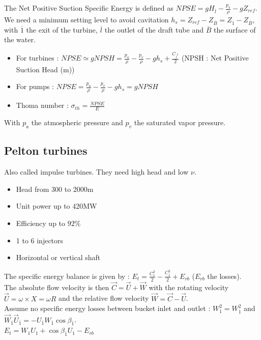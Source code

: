 \documentclass[../main.tex]{subfiles}
\begin{document}
The Net Positive Suction Specific Energy is defined as $NPSE = gH_{\overline{l}} - \frac{p_v}{\rho} - gZ_{ref}$. We need a minimum setting level to avoid cavitation $h_s = Z_{ref} - Z_{\overline{B}} = Z_{\overline{1}} - Z_{\overline{B}}$, with $\overline{1}$ the exit of the turbine, $\overline{l}$ the outlet of the draft tube and $\overline{B}$ the surface of the water.\\
\begin{itemize}
    \item For turbines : $NPSE \simeq g NPSH = \frac{p_a}{\rho} - \frac{p_v}{\rho} - gh_s + \frac{C_{\overline{l}^2}}{2}$ (NPSH : Net Positive Suction Head (m))
    \item For pumps : $NPSE = \frac{p_a}{\rho} - \frac{p_v}{\rho} - gh_s = g NPSH$
    \item Thoma number : $\sigma_{th} = \frac{NPSE}{E}$
\end{itemize}
With $p_a$ the atmospheric pressure and $p_v$ the saturated vapor pressure.

\subsection{Pelton turbines}
Also called impulse turbines. They need high head and low $\nu$.
\begin{itemize}
    \item Head from 300 to 2000m
    \item Unit power up to 420MW
    \item Efficiency up to $92\%$
    \item 1 to 6 injectors
    \item Horizontal or vertical shaft
\end{itemize}

The specific energy balance is given by : $E_t = \frac{C_1^2}{2} - \frac{C_{\overline{1}}^2}{2} + E_{rb}$ ($E_{rb}$ the losses).\\

The absolute flow velocity is then $\overrightarrow{C} = \overrightarrow{U} + \overrightarrow{W}$ with the rotating velocity $\overrightarrow{U} = \omega \times X = \omega R$ and the relative flow velocity $\overrightarrow{W} = \overrightarrow{C} - \overrightarrow{U}$.\\

Assume no specific energy losses between bucket inlet and outlet : $W_1^2 = W_{\overline{1}}^2$ and $\Vec{W}_{\overline{1}} \Vec{U}_{\overline{1}} = -U_{\overline{1}} W_{\overline{1}} \cos \beta_{\overline{1}}$.\\
$E_t = W_1 U_1 + \cos \beta_{\overline{1}} U_1 -E_{rb} $\\
\end{document}
